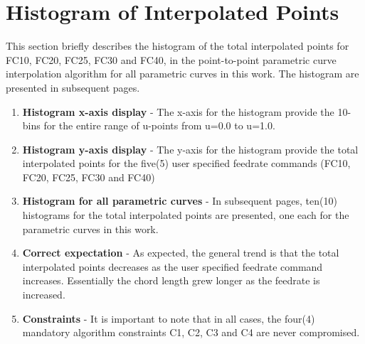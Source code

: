 
\section{Histogram of Interpolated Points}

This section briefly describes the histogram of the total interpolated points for FC10, FC20, FC25, FC30 and FC40, in the point-to-point parametric curve interpolation algorithm for all parametric curves in this work. The histogram are presented in subsequent pages.

\begin{enumerate}
	\item \textbf{Histogram x-axis display} - The x-axis for the histogram provide the 10-bins for the entire range of u-points from u=0.0 to u=1.0.
	
	\item \textbf{Histogram y-axis display} - The y-axis for the histogram provide the total interpolated points for the five(5) user specified feedrate commands (FC10, FC20, FC25, FC30 and FC40)
	
	\item \textbf{Histogram for all parametric curves} - In subsequent pages, ten(10) histograms for the total interpolated points are presented, one each for the parametric curves in this work.
	
	\item \textbf{Correct expectation} - As expected, the general trend is that the total interpolated points decreases as the user specified feedrate command increases. Essentially the chord length grew longer as the feedrate is increased.
	
	\item \textbf{Constraints} - It is important to note that in all cases, the four(4) mandatory algorithm constraints C1, C2, C3 and C4 are never compromised.

	
\end{enumerate}


